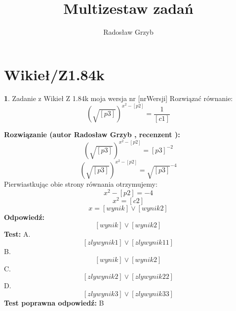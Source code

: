 \documentclass[12pt, a4paper]{article}
\title{Multizestaw zadań}
\author{Radosław Grzyb}
\date{}
\theoremstyle{definition} %
\newtheorem{zad}{}
\newcommand{\kategoria}[1]{\section{#1}} %
\newcommand{\zadStart}[1]{\begin{zad}#1\newline} %
\newcommand{\zadStop}{\end{zad}}   %
\newcommand{\rozwStart}[2]{\noindent \textbf{Rozwiązanie (autor #1 , recenzent #2): }\newline} %
\newcommand{\rozwStop}{\newline}                                            %
\newcommand{\odpStart}{\noindent \textbf{Odpowiedź:}\newline}    %
\newcommand{\odpStop}{\newline}                                             %
\newcommand{\testStart}{\noindent \textbf{Test:}\newline} %
\newcommand{\testStop}{\newline} %
\newcommand{\kluczStart}{\noindent \textbf{Test poprawna odpowiedź:}\newline} %
\newcommand{\kluczStop}{\newline} %
\begin{document}
\maketitle
\kategoria{Wikieł/Z1.84k}
\zadStart{Zadanie z Wikieł Z 1.84k moja wersja nr [nrWersji]}
Rozwiązać równanie:
$$(\sqrt{[p3]})^{x^{2}-[p2]}=\frac{1}{[c1]}$$
\zadStop
\rozwStart{Radosław Grzyb}{}
$$(\sqrt{[p3]})^{x^{2}-[p2]}=[p3]^{-2}$$
$$(\sqrt{[p3]})^{x^{2}-[p2]}=\sqrt{[p3]}^{-4}$$
Pierwiastkując obie strony równania otrzymujemy:
$$x^{2}-[p2]=-4$$
$$x^{2}=[c2]$$
$$x=[wynik] \vee [wynik2]$$
\rozwStop
\odpStart
$$[wynik] \vee [wynik2]$$
\odpStop
\testStart
A.$$[zlywynik1] \vee [zlywynik11]$$
B.$$[wynik] \vee [wynik2]$$
C.$$[zlywynik2] \vee [zlywynik22]$$
D.$$[zlywynik3] \vee [zlywynik33]$$
\testStop
\kluczStart
B
\kluczStop
\end{document}
